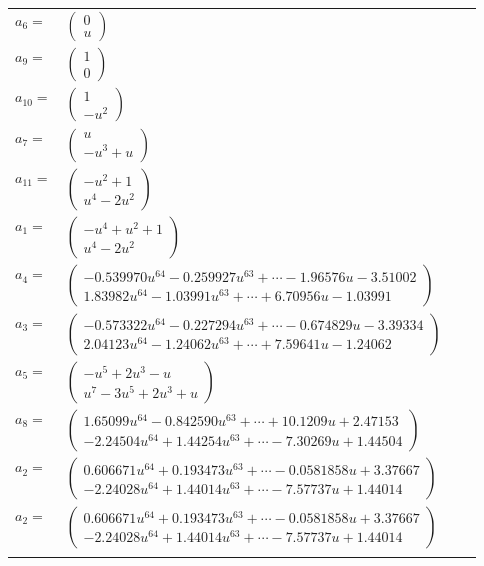 \documentclass[1p]{elsarticle_modified}
\theoremstyle{definition}
\begin{document}
\begin{tabular}{m{7pt} m{180pt} m{7pt} m{180pt} }
\flushright $a_{6}=$&$\begin{pmatrix}0\\u\end{pmatrix}$ \\
\flushright $a_{9}=$&$\begin{pmatrix}1\\0\end{pmatrix}$ \\
\flushright $a_{10}=$&$\begin{pmatrix}1\\- u^2\end{pmatrix}$ \\
\flushright $a_{7}=$&$\begin{pmatrix}u\\- u^3+u\end{pmatrix}$ \\
\flushright $a_{11}=$&$\begin{pmatrix}- u^2+1\\u^4-2 u^2\end{pmatrix}$ \\
\flushright $a_{1}=$&$\begin{pmatrix}- u^4+u^2+1\\u^4-2 u^2\end{pmatrix}$ \\
\flushright $a_{4}=$&$\begin{pmatrix}-0.539970 u^{64}-0.259927 u^{63}+\cdots-1.96576 u-3.51002\\1.83982 u^{64}-1.03991 u^{63}+\cdots+6.70956 u-1.03991\end{pmatrix}$ \\
\flushright $a_{3}=$&$\begin{pmatrix}-0.573322 u^{64}-0.227294 u^{63}+\cdots-0.674829 u-3.39334\\2.04123 u^{64}-1.24062 u^{63}+\cdots+7.59641 u-1.24062\end{pmatrix}$ \\
\flushright $a_{5}=$&$\begin{pmatrix}- u^5+2 u^3- u\\u^7-3 u^5+2 u^3+u\end{pmatrix}$ \\
\flushright $a_{8}=$&$\begin{pmatrix}1.65099 u^{64}-0.842590 u^{63}+\cdots+10.1209 u+2.47153\\-2.24504 u^{64}+1.44254 u^{63}+\cdots-7.30269 u+1.44504\end{pmatrix}$ \\
\flushright $a_{2}=$&$\begin{pmatrix}0.606671 u^{64}+0.193473 u^{63}+\cdots-0.0581858 u+3.37667\\-2.24028 u^{64}+1.44014 u^{63}+\cdots-7.57737 u+1.44014\end{pmatrix}$\\ \flushright $a_{2}=$&$\begin{pmatrix}0.606671 u^{64}+0.193473 u^{63}+\cdots-0.0581858 u+3.37667\\-2.24028 u^{64}+1.44014 u^{63}+\cdots-7.57737 u+1.44014\end{pmatrix}$\\&\end{tabular}
\end{document}
